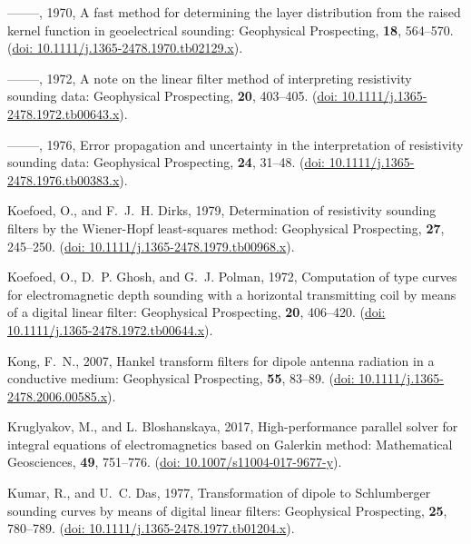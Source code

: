 \documentclass[paper,twocolumn,twoside]{geophysics}
\begin{document}
\begin{thebibliography}{}
--------, 1970, A fast method for determining the layer distribution from the
  raised kernel function in geoelectrical sounding: Geophysical Prospecting,
  {\bf 18}, 564--570.
\newblock (\href{https://doi.org/10.1111/j.1365-2478.1970.tb02129.x}{doi:
  10.1111/j.1365-2478.1970.tb02129.x}).

--------, 1972, A note on the linear filter method of interpreting resistivity
  sounding data: Geophysical Prospecting, {\bf 20}, 403--405.
\newblock (\href{https://doi.org/10.1111/j.1365-2478.1972.tb00643.x}{doi:
  10.1111/j.1365-2478.1972.tb00643.x}).

--------, 1976, Error propagation and uncertainty in the interpretation of
  resistivity sounding data: Geophysical Prospecting, {\bf 24}, 31--48.
\newblock (\href{https://doi.org/10.1111/j.1365-2478.1976.tb00383.x}{doi:
  10.1111/j.1365-2478.1976.tb00383.x}).

Koefoed, O., and F.~J.~H. Dirks,  1979, Determination of resistivity sounding
  filters by the {W}iener-{H}opf least-squares method: Geophysical Prospecting,
  {\bf 27}, 245--250.
\newblock (\href{https://doi.org/10.1111/j.1365-2478.1979.tb00968.x}{doi:
  10.1111/j.1365-2478.1979.tb00968.x}).

Koefoed, O., D.~P. Ghosh, and G.~J. Polman,  1972, Computation of type curves
  for electromagnetic depth sounding with a horizontal transmitting coil by
  means of a digital linear filter: Geophysical Prospecting, {\bf 20},
  406--420.
\newblock (\href{https://doi.org/10.1111/j.1365-2478.1972.tb00644.x}{doi:
  10.1111/j.1365-2478.1972.tb00644.x}).

Kong, F.~N.,  2007, Hankel transform filters for dipole antenna radiation in a
  conductive medium: Geophysical Prospecting, {\bf 55}, 83--89.
\newblock (\href{https://doi.org/10.1111/j.1365-2478.2006.00585.x}{doi:
  10.1111/j.1365-2478.2006.00585.x}).

Kruglyakov, M., and L. Bloshanskaya,  2017, High-performance parallel solver
  for integral equations of electromagnetics based on {G}alerkin method:
  Mathematical Geosciences, {\bf 49}, 751--776.
\newblock (\href{https://doi.org/10.1007/s11004-017-9677-y}{doi:
  10.1007/s11004-017-9677-y}).

Kumar, R., and U.~C. Das,  1977, Transformation of dipole to {S}chlumberger
  sounding curves by means of digital linear filters: Geophysical Prospecting,
  {\bf 25}, 780--789.
\newblock (\href{https://doi.org/10.1111/j.1365-2478.1977.tb01204.x}{doi:
  10.1111/j.1365-2478.1977.tb01204.x}).


\end{thebibliography}
\end{document}
